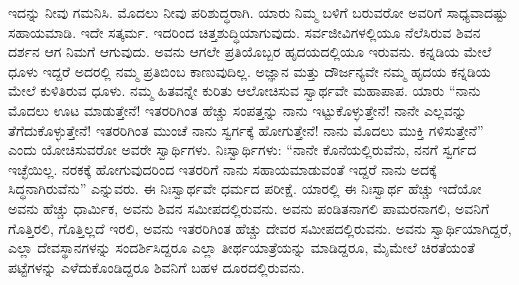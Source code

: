 ಇದನ್ನು ನೀವು ಗಮನಿಸಿ. ಮೊದಲು ನೀವು ಪರಿಶುದ್ಧರಾಗಿ. ಯಾರು ನಿಮ್ಮ ಬಳಿಗೆ ಬರುವರೋ ಅವರಿಗೆ ಸಾಧ್ಯವಾದಷ್ಟು ಸಹಾಯಮಾಡಿ. ಇದೇ ಸತ್ಕರ್ಮ. ಇದರಿಂದ ಚಿತ್ತಶುದ್ಧಿಯಾಗುವುದು. ಸರ್ವಜೀವಿಗಳಲ್ಲಿಯೂ ನೆಲೆಸಿರುವ ಶಿವನ ದರ್ಶನ ಆಗ ನಿಮಗೆ ಆಗುವುದು. ಅವನು ಆಗಲೇ ಪ್ರತಿಯೊಬ್ಬರ ಹೃದಯದಲ್ಲಿಯೂ ಇರುವನು. ಕನ್ನಡಿಯ ಮೇಲೆ ಧೂಳು ಇದ್ದರೆ ಅದರಲ್ಲಿ ನಮ್ಮ ಪ್ರತಿಬಿಂಬ ಕಾಣುವುದಿಲ್ಲ. ಅಜ್ಞಾನ ಮತ್ತು ದೌರ್ಜನ್ಯವೇ ನಮ್ಮ ಹೃದಯ ಕನ್ನಡಿಯ ಮೇಲೆ ಕುಳಿತಿರುವ ಧೂಳು. ನಮ್ಮ ಹಿತವನ್ನೇ ಕುರಿತು ಆಲೋಚಿಸುವ ಸ್ವಾರ್ಥವೇ ಮಹಾಪಾಪ. ಯಾರು “ನಾನು ಮೊದಲು ಊಟ ಮಾಡುತ್ತೇನೆ! ಇತರರಿಗಿಂತ ಹೆಚ್ಚು ಸಂಪತ್ತನ್ನು ನಾನು ಇಟ್ಟುಕೊಳ್ಳುತ್ತೇನೆ! ನಾನೇ ಎಲ್ಲವನ್ನು ತೆಗೆದುಕೊಳ್ಳುತ್ತೇನೆ! ಇತರರಿಗಿಂತ ಮುಂಚೆ ನಾನು ಸ್ವರ್ಗಕ್ಕೆ ಹೋಗುತ್ತೇನೆ! ನಾನು ಮೊದಲು ಮುಕ್ತಿ ಗಳಿಸುತ್ತೇನೆ” ಎಂದು ಯೋಚಿಸುವರೋ ಅವರೇ ಸ್ವಾರ್ಥಿಗಳು. ನಿಃಸ್ವಾರ್ಥಿಗಳು: “ನಾನೇ ಕೊನೆಯಲ್ಲಿರುವೆನು, ನನಗೆ ಸ್ವರ್ಗದ ಇಚ್ಛೆಯಿಲ್ಲ. ನರಕಕ್ಕೆ ಹೋಗುವುದರಿಂದ ಇತರರಿಗೆ ನಾನು ಸಹಾಯಮಾಡುವಂತೆ ಇದ್ದರೆ ನಾನು ಅದಕ್ಕೆ ಸಿದ್ಧನಾಗಿರುವೆನು” ಎನ್ನುವರು. ಈ ನಿಃಸ್ವಾರ್ಥವೇ ಧರ್ಮದ ಪರೀಕ್ಷೆ. ಯಾರಲ್ಲಿ ಈ ನಿಃಸ್ವಾರ್ಥ ಹೆಚ್ಚು ಇದೆಯೋ ಅವನು ಹೆಚ್ಚು ಧಾರ್ಮಿಕ, ಅವನು ಶಿವನ ಸಮೀಪದಲ್ಲಿರುವನು. ಅವನು ಪಂಡಿತನಾಗಲಿ ಪಾಮರನಾಗಲಿ, ಅವನಿಗೆ ಗೊತ್ತಿರಲಿ, ಗೊತ್ತಿಲ್ಲದೆ ಇರಲಿ, ಅವನು ಇತರರಿಗಿಂತ ಹೆಚ್ಚು ದೇವರ ಸಮೀಪದಲ್ಲಿರುವನು. ಅವನು ಸ್ವಾರ್ಥಿಯಾಗಿದ್ದರೆ, ಎಲ್ಲಾ ದೇವಸ್ಥಾನಗಳನ್ನು ಸಂದರ್ಶಿಸಿದ್ದರೂ ಎಲ್ಲಾ ತೀರ್ಥಯಾತ್ರೆಯನ್ನು ಮಾಡಿದ್ದರೂ, ಮೈಮೇಲೆ ಚಿರತೆಯಂತೆ ಪಟ್ಟೆಗಳನ್ನು ಎಳೆದುಕೊಂಡಿದ್ದರೂ ಶಿವನಿಗೆ ಬಹಳ ದೂರದಲ್ಲಿರುವನು.

